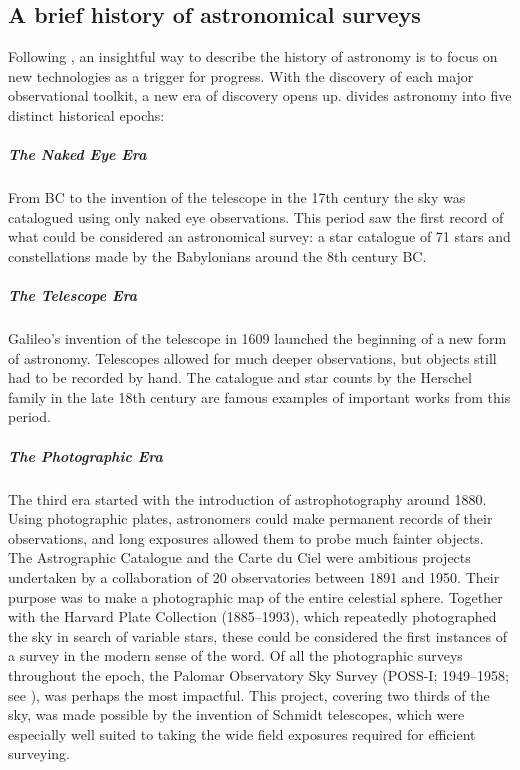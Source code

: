 \subsection{A brief history of astronomical surveys}\label{subsection:history}
Following \cite{wynn2016surveying}, an insightful way to describe the history of astronomy is to focus on new technologies as a trigger for progress. With the discovery of each major observational toolkit, a new era of discovery opens up. \cite{wynn2016surveying} divides astronomy into five distinct historical epochs: 

\subparagraph{The Naked Eye Era} From BC to the invention of the telescope in the 17th century the sky was catalogued using only naked eye observations. This period saw the first record of what could be considered an astronomical survey: a star catalogue of 71 stars and constellations made by the Babylonians around the 8th century BC. 

\subparagraph{The Telescope Era} Galileo’s invention of the telescope in 1609 launched the beginning of a new form of astronomy. Telescopes allowed for much deeper observations, but objects still had to be recorded by hand. The \cite{1781cote.rept..227M} catalogue  and star counts by the Herschel family in the late 18th century are famous examples of important works from this period. 

\subparagraph{The Photographic Era} The third era started with the introduction of astrophotography around 1880. Using photographic plates, astronomers could make permanent records of their observations, and long exposures allowed them to probe much fainter objects. The Astrographic Catalogue and the Carte du Ciel were ambitious projects undertaken by a collaboration of 20 observatories between 1891 and 1950. Their purpose was to make a photographic map of the entire celestial sphere. Together with the Harvard Plate Collection (1885--1993), which repeatedly photographed the sky in search of variable stars, these could be considered the first instances of a survey in the modern sense of the word. Of all the photographic surveys throughout the epoch, the Palomar Observatory Sky Survey (POSS-I; 1949--1958; see \citealt{1963bad..book..481M}), was perhaps the most impactful. This project, covering two thirds of the sky, was made possible by the invention of Schmidt telescopes, which were especially well suited to taking the wide field exposures required for efficient surveying.

